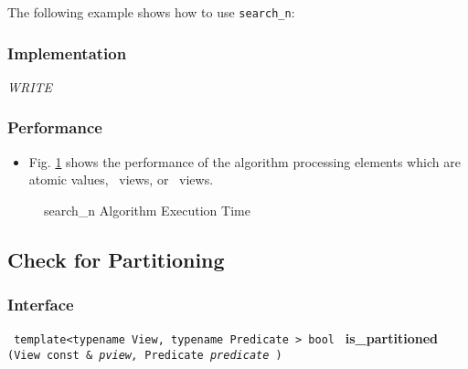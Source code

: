 The following example shows how to use \texttt{search\_n}:


\subsubsection{Implementation} %

\textit{WRITE}

\subsubsection{Performance} %

\begin{itemize}
\item
Fig. \ref{fig:searchn-alg-exec-exper}
shows the performance of the algorithm processing
elements which are atomic values, \stl\ views, or \stapl\ views.
\end{itemize}

\begin{figure}[p]
\caption{search\_n Algorithm Execution Time}
\label{fig:searchn-alg-exec-exper}
\end{figure}



\subsection{Check for Partitioning} \label{sec-sumry-is_part}

\subsubsection{Interface} %

\noindent
\texttt{%
template<typename View, typename Predicate >
\newline
bool 
}
\newline
\textbf{is\_partitioned}%
\texttt{%
(View const \&
\textit{pview,}%
Predicate 
\textit{predicate}%
)
}

